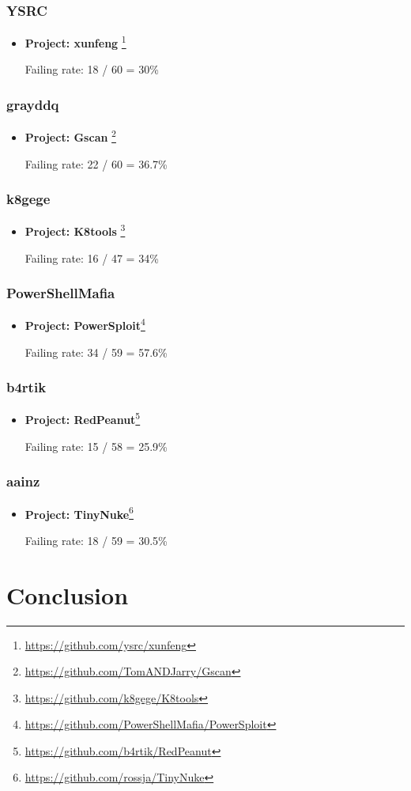\documentclass[]{acmart}
\begin{document}
\subsubsection{YSRC}
\begin{itemize}
    \item { \bf Project: xunfeng }\footnote{\url{https://github.com/ysrc/xunfeng}}
    
    Failing rate: 18 / 60 = 30\%
\end{itemize}

\subsubsection{grayddq}
\begin{itemize}
    \item { \bf Project: Gscan }\footnote{\url{https://github.com/TomANDJarry/Gscan}}
    
    Failing rate: 22 / 60 = 36.7\%
\end{itemize}

\subsubsection{k8gege}
\begin{itemize}
    \item { \bf Project: K8tools }\footnote{\url{https://github.com/k8gege/K8tools}}
    
    Failing rate: 16  / 47 = 34\%
\end{itemize}

\subsubsection{PowerShellMafia}
\begin{itemize}
    \item { \bf Project: PowerSploit}\footnote{{\url{https://github.com/PowerShellMafia/PowerSploit}}}
    
    Failing rate: 34 / 59 = 57.6\%
\end{itemize}

\subsubsection{b4rtik}
\begin{itemize}
    \item { \bf Project: RedPeanut}\footnote{\url{https://github.com/b4rtik/RedPeanut}}
    
    Failing rate: 15 / 58 = 25.9\%
\end{itemize}

\subsubsection{aainz}
\begin{itemize}
    \item { \bf Project: TinyNuke}\footnote{\url{https://github.com/rossja/TinyNuke}}

    Failing rate: 18 / 59 = 30.5\%
\end{itemize}

\section{Conclusion}
\end{document}
